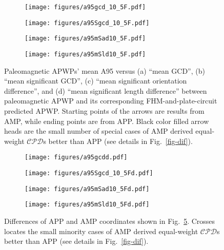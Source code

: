 \begin{figure}
\captionsetup[subfigure]{singlelinecheck=off,justification=raggedright,aboveskip=-6pt,belowskip=-6pt}
\centering
  \begin{subfigure}[htbp]{.49\textwidth}
	\caption{}\texttt{[image: figures/a95gcd\_10\_5F.pdf]}\label{fig-A95GCD105F}
  \end{subfigure}
  \begin{subfigure}[htbp]{.49\textwidth}
	\caption{}\texttt{[image: figures/a95Sgcd\_10\_5F.pdf]}\label{fig-A95SGCD105F}
  \end{subfigure}
  \begin{subfigure}[htbp]{.49\textwidth}
	\caption{}\texttt{[image: figures/a95mSad10\_5F.pdf]}\label{fig-A95mSad105F}
  \end{subfigure}
  \begin{subfigure}[htbp]{.49\textwidth}
	\caption{}\texttt{[image: figures/a95mSld10\_5F.pdf]}\label{fig-A95mSld105F}
  \end{subfigure}
\caption[APP spatially better than AMP]{Paleomagnetic APWPs' mean A95 versus
(a) ``mean GCD'', (b) ``mean significant GCD'', (c) ``mean significant
orientation difference'', and (d) ``mean significant length difference'' between
paleomagnetic APWP and its corresponding FHM-and-plate-circuit predicted APWP\@.
Starting points of the arrows are results from AMP, while ending points are from
APP\@. Black color filled arrow heads are the small number of special cases of
AMP derived equal-weight $\mathcal{CPD}$s better than APP (see details in
Fig.~\ref{fig-dif}).}\label{fig-A95mG105F}
\end{figure}

\begin{figure}
\captionsetup[subfigure]{singlelinecheck=off,justification=raggedright,aboveskip=-6pt,belowskip=-6pt}
\centering
  \begin{subfigure}[htbp]{.49\textwidth}
	\caption{}\texttt{[image: figures/a95gcdd.pdf]}\label{fig-A95GCD105Fd}
  \end{subfigure}
  \begin{subfigure}[htbp]{.49\textwidth}
	\caption{}\texttt{[image: figures/a95Sgcd\_10\_5Fd.pdf]}\label{fig-A95SGCD105Fd}
  \end{subfigure}
  \begin{subfigure}[htbp]{.49\textwidth}
	\caption{}\texttt{[image: figures/a95mSad10\_5Fd.pdf]}\label{fig-A95mSad105Fd}
  \end{subfigure}
  \begin{subfigure}[htbp]{.49\textwidth}
	\caption{}\texttt{[image: figures/a95mSld10\_5Fd.pdf]}\label{fig-A95mSld105Fd}
  \end{subfigure}
\caption[APP spatially better than AMP]{Differences of APP and AMP coordinates
shown in Fig.~\ref{fig-A95mG105F}. Crosses locates the small minority cases of
AMP derived equal-weight $\mathcal{CPD}$s better than APP (see details in
Fig.~\ref{fig-dif}).}\label{fig-A95mG105Fd}
\end{figure}

